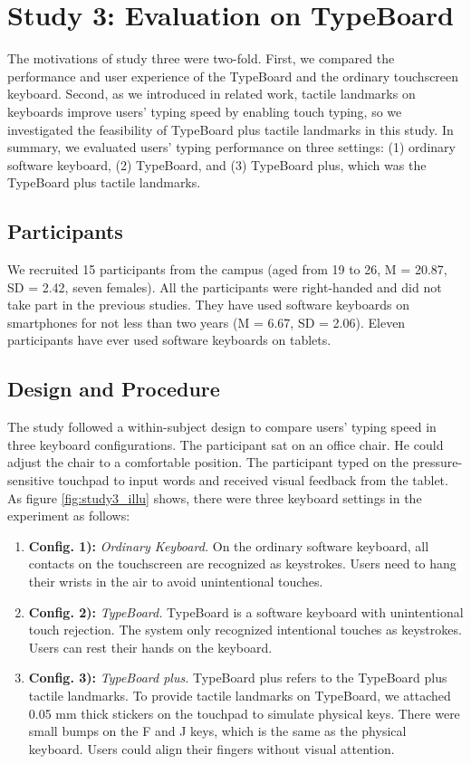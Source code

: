 \section{Study 3: Evaluation on TypeBoard}

The motivations of study three were two-fold. First, we compared the performance and user experience of the TypeBoard and the ordinary touchscreen keyboard. Second, as we introduced in related work, tactile landmarks on keyboards improve users' typing speed by enabling touch typing, so we investigated the feasibility of TypeBoard plus tactile landmarks in this study. In summary, we evaluated users' typing performance on three settings: (1) ordinary software keyboard, (2) TypeBoard, and (3) TypeBoard plus, which was the TypeBoard plus tactile landmarks.

\subsection{Participants}

We recruited 15 participants from the campus (aged from 19 to 26, M = 20.87, SD = 2.42, seven females). All the participants were right-handed and did not take part in the previous studies. They have used software keyboards on smartphones for not less than two years (M = 6.67, SD = 2.06). Eleven participants have ever used software keyboards on tablets.

\subsection{Design and Procedure}

The study followed a within-subject design to compare users' typing speed in three keyboard configurations. The participant sat on an office chair. He could adjust the chair to a comfortable position. The participant typed on the pressure-sensitive touchpad to input words and received visual feedback from the tablet. As figure \ref{fig:study3_illu} shows, there were three keyboard settings in the experiment as follows:

\begin{enumerate}
	\item{\textbf{Config. 1):} \emph{Ordinary Keyboard.} On the ordinary software keyboard, all contacts on the touchscreen are recognized as keystrokes. Users need to hang their wrists in the air to avoid unintentional touches.}
	\item{\textbf{Config. 2):} \emph{TypeBoard.} TypeBoard is a software keyboard with unintentional touch rejection. The system only recognized intentional touches as keystrokes. Users can rest their hands on the keyboard.}
	\item{\textbf{Config. 3):} \emph{TypeBoard plus.} TypeBoard plus refers to the TypeBoard plus tactile landmarks. To provide tactile landmarks on TypeBoard, we attached 0.05 mm thick stickers on the touchpad to simulate physical keys. There were small bumps on the F and J keys, which is the same as the physical keyboard. Users could align their fingers without visual attention.}
\end{enumerate}

